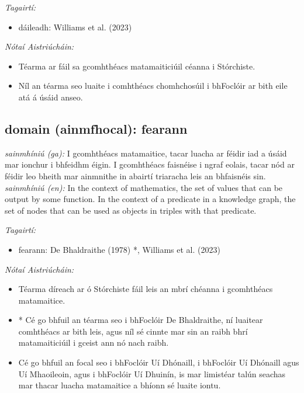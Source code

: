 \documentclass{article}
\begin{document}
 \noindent \textit{Tagairtí:}
\begin{itemize}
	\item dáileadh: Williams et al. (2023) \cite{storchiste}
\end{itemize}

 \noindent \textit{Nótaí Aistriúcháin:}
\begin{itemize}
	\item Téarma ar fáil sa gcomhthéacs matamaiticiúil céanna i Stórchiste.
	\item Níl an téarma seo luaite i comhthéacs chomhchosúil i bhFoclóir ar bith eile atá á úsáid anseo.
\end{itemize}


\subsection*{domain (ainmfhocal): fearann} 
 \noindent \textit{sainmhíniú (ga):} I gcomhthéacs matamaitice, tacar luacha ar féidir iad a úsáid mar ionchur i bhfeidhm éigin. I gcomhthéacs faisnéise i ngraf eolais, tacar nód ar féidir leo bheith mar ainmnithe in abairtí triaracha leis an bhfaisnéis sin.
\newline\newline
 \noindent \textit{sainmhíniú (en):} In the context of mathematics, the set of values that can be output by some function. In the context of a predicate in a knowledge graph, the set of nodes that can be used as objects in triples with that predicate.
\newline

 \noindent \textit{Tagairtí:}
\begin{itemize}
	\item fearann: De Bhaldraithe (1978) \cite{de-bhaldraithe}*, Williams et al. (2023) \cite{storchiste}
\end{itemize}

 \noindent \textit{Nótaí Aistriúcháin:}
\begin{itemize}
	\item Téarma díreach ar ó Stórchiste fáil leis an mbrí chéanna i gcomhthéacs matamaitice.
	\item * Cé go bhfuil an téarma seo i bhFoclóir De Bhaldraithe, ní luaitear comhthéacs ar bith leis, agus níl sé cinnte mar sin an raibh bhrí matamaiticiúil i gceist ann nó nach raibh.
	\item Cé go bhfuil an focal seo i bhFoclóir Uí Dhónaill, i bhFoclóir Uí Dhónaill agus Uí Mhaoileoin, agus i bhFoclóir Uí Dhuinín, is mar limistéar talún seachas mar thacar luacha matamaitice a bhíonn sé luaite iontu.
\end{itemize}
\end{document}
